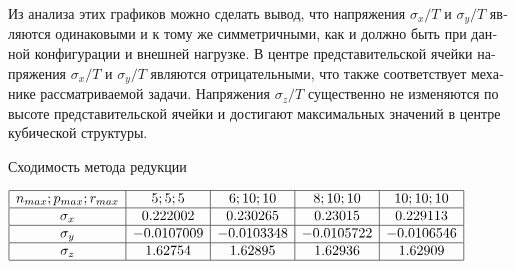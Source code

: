 \begin{russian}
Из анализа этих графиков можно сделать вывод, что напряжения $\sigma_x/T$ и $\sigma_y/T$ являются одинаковыми и к тому же симметричными, как и должно быть при данной конфигурации и внешней нагрузке. В центре представительской ячейки напряжения $\sigma_x/T$ и $\sigma_y/T$ являются отрицательными, что также соответствует механике рассматриваемой задачи. Напряжения $\sigma_z/T$ существенно не изменяются по высоте представительской ячейки и достигают максимальных значений в центре кубической структуры.

\begin{table}[b]
\caption{Сходимость метода редукции}
\centering
$
\begin{array}{|c|c|c|c|c|}
\hline
n_{max}; p_{max}; r_{max} & 5; 5; 5 & 6; 10; 10 & 8; 10; 10 & 10; 10; 10 \\
\hline
\sigma_x & 0.222002		& 0.230265 	& 0.23015 		& 0.229113 \\
\hline
\sigma_y & -0.0107009 	& -0.0103348 	& -0.0105722 	& -0.0106546 \\
\hline
\sigma_z & 1.62754 		& 1.62895 		& 1.62936 		& 1.62909 \\
\hline
\end{array}
$
\label{t:8:1}
\end{table}



\end{russian}
